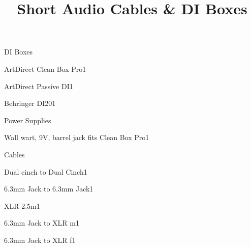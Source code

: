 \def\papersize{5}




\title{Short Audio Cables \& DI Boxes}

\begin{checklist}{DI Boxes}
  \item{ArtDirect Clean Box Pro}{1}
  \item{ArtDirect Passive DI}{1}
  \item{Behringer DI20}{1}
\end{checklist}

\begin{checklist}{Power Supplies}
  \item{Wall wart, 9V, barrel jack fits Clean Box Pro}{1}
\end{checklist}

\begin{checklist}{Cables}
  \item{Dual cinch to Dual Cinch}{1}
  \item{6.3mm Jack to 6.3mm Jack}{1}
  \item{XLR 2.5m}{1}
  \item{6.3mm Jack to XLR m}{1}
  \item{6.3mm Jack to XLR f}{1}
\end{checklist}


